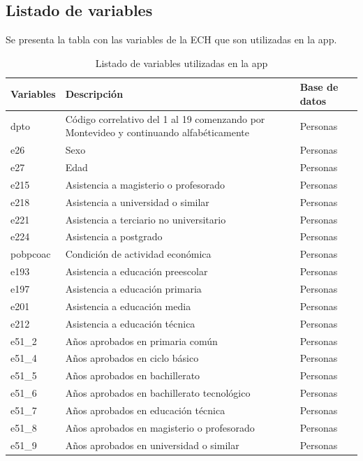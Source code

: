 \documentclass[12pt,twoside,spanish,a4paper]{book}\usepackage[]{graphicx}\usepackage[]{color}
\begin{document}
\begin{appendix}
\section{Listado de variables \label{ane:var}}

Se presenta la tabla con las variables de la ECH que son utilizadas en la app.

\begin{longtable}{p{1in}p{3.7in}p{1.3in}}
\caption{Listado de variables utilizadas en la app} \\ 
  \hline
Variables & Descripción & Base de datos \\ 
  \hline
dpto & Código correlativo del 1 al 19 comenzando por Montevideo y continuando alfabéticamente & Personas \\ 
  e26 & Sexo & Personas \\ 
  e27 & Edad & Personas \\ 
  e215 & Asistencia a magisterio o profesorado & Personas \\ 
  e218 & Asistencia a universidad o similar & Personas \\ 
  e221 & Asistencia a terciario no universitario & Personas \\ 
  e224 & Asistencia a postgrado & Personas \\ 
  pobpcoac & Condición de actividad económica & Personas \\ 
  e193 & Asistencia a educación preescolar & Personas \\ 
  e197 & Asistencia a educación primaria & Personas \\ 
  e201 & Asistencia a educación media & Personas \\ 
  e212 & Asistencia a educación técnica & Personas \\ 
  e51\_2 & Años aprobados en primaria común & Personas \\ 
  e51\_4 & Años aprobados en ciclo básico & Personas \\ 
  e51\_5 & Años aprobados en bachillerato & Personas \\ 
  e51\_6 & Años aprobados en bachillerato tecnológico & Personas \\ 
  e51\_7 & Años aprobados en educación técnica & Personas \\ 
  e51\_8 & Años aprobados en magisterio o profesorado & Personas \\ 
  e51\_9 & Años aprobados en universidad o similar & Personas \\ 

\end{longtable}
\end{appendix}
\end{document}
